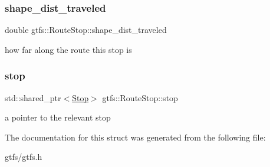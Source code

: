 \subsubsection{\texorpdfstring{shape\+\_\+dist\+\_\+traveled}{shape\_dist\_traveled}}
{\footnotesize\ttfamily double gtfs\+::\+Route\+Stop\+::shape\+\_\+dist\+\_\+traveled}

how far along the route this stop is \mbox{\label{structgtfs_1_1RouteStop_af70ced2604121bbeb159da66bbd00c64}} 
\subsubsection{\texorpdfstring{stop}{stop}}
{\footnotesize\ttfamily std\+::shared\+\_\+ptr$<$\hyperlink{classgtfs_1_1Stop}{Stop}$>$ gtfs\+::\+Route\+Stop\+::stop}

a pointer to the relevant stop 

The documentation for this struct was generated from the following file\+:\begin{DoxyCompactItemize}
\item 
gtfs/gtfs.\+h\end{DoxyCompactItemize}
